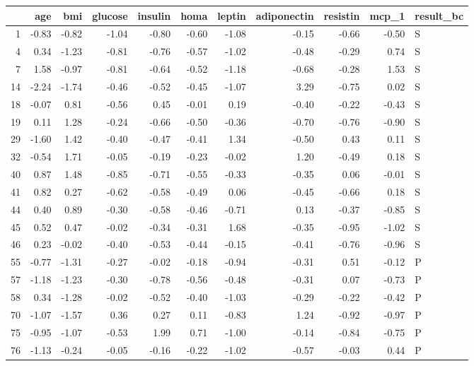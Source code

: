 \begin{table}[ht]
\centering
\begin{tabular}{rrrrrrrrrrl}
  \hline
 & age & bmi & glucose & insulin & homa & leptin & adiponectin & resistin & mcp\_1 & result\_bc \\ 
  \hline
1 & -0.83 & -0.82 & -1.04 & -0.80 & -0.60 & -1.08 & -0.15 & -0.66 & -0.50 & S \\ 
  4 & 0.34 & -1.23 & -0.81 & -0.76 & -0.57 & -1.02 & -0.48 & -0.29 & 0.74 & S \\ 
  7 & 1.58 & -0.97 & -0.81 & -0.64 & -0.52 & -1.18 & -0.68 & -0.28 & 1.53 & S \\ 
  14 & -2.24 & -1.74 & -0.46 & -0.52 & -0.45 & -1.07 & 3.29 & -0.75 & 0.02 & S \\ 
  18 & -0.07 & 0.81 & -0.56 & 0.45 & -0.01 & 0.19 & -0.40 & -0.22 & -0.43 & S \\ 
  19 & 0.11 & 1.28 & -0.24 & -0.66 & -0.50 & -0.36 & -0.70 & -0.76 & -0.90 & S \\ 
  29 & -1.60 & 1.42 & -0.40 & -0.47 & -0.41 & 1.34 & -0.50 & 0.43 & 0.11 & S \\ 
  32 & -0.54 & 1.71 & -0.05 & -0.19 & -0.23 & -0.02 & 1.20 & -0.49 & 0.18 & S \\ 
  40 & 0.87 & 1.48 & -0.85 & -0.71 & -0.55 & -0.33 & -0.35 & 0.06 & -0.01 & S \\ 
  41 & 0.82 & 0.27 & -0.62 & -0.58 & -0.49 & 0.06 & -0.45 & -0.66 & 0.18 & S \\ 
  44 & 0.40 & 0.89 & -0.30 & -0.58 & -0.46 & -0.71 & 0.13 & -0.37 & -0.85 & S \\ 
  45 & 0.52 & 0.47 & -0.02 & -0.34 & -0.31 & 1.68 & -0.35 & -0.95 & -1.02 & S \\ 
  46 & 0.23 & -0.02 & -0.40 & -0.53 & -0.44 & -0.15 & -0.41 & -0.76 & -0.96 & S \\ 
  55 & -0.77 & -1.31 & -0.27 & -0.02 & -0.18 & -0.94 & -0.31 & 0.51 & -0.12 & P \\ 
  57 & -1.18 & -1.23 & -0.30 & -0.78 & -0.56 & -0.48 & -0.31 & 0.07 & -0.73 & P \\ 
  58 & 0.34 & -1.28 & -0.02 & -0.52 & -0.40 & -1.03 & -0.29 & -0.22 & -0.42 & P \\ 
  70 & -1.07 & -1.57 & 0.36 & 0.27 & 0.11 & -0.83 & 1.24 & -0.92 & -0.97 & P \\ 
  75 & -0.95 & -1.07 & -0.53 & 1.99 & 0.71 & -1.00 & -0.14 & -0.84 & -0.75 & P \\ 
  76 & -1.13 & -0.24 & -0.05 & -0.16 & -0.22 & -1.02 & -0.57 & -0.03 & 0.44 & P \\ 

\end{tabular}
\end{table}
